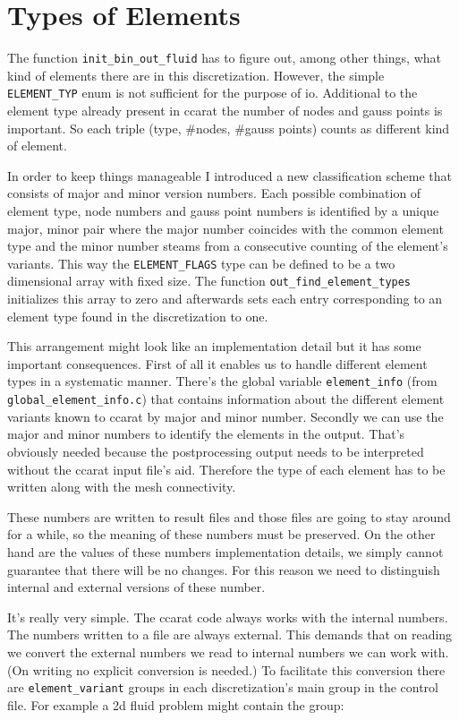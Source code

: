 \section{Types of Elements}

The function \texttt{init{\_}bin{\_}out{\_}fluid} has to figure
out, among other things, what kind of elements there are in this discretization.
However, the simple \texttt{ELEMENT{\_}TYP} enum is not sufficient
for the purpose of io. Additional to the element type already present
in ccarat the number of nodes and gauss points is important. So each
triple (type, {\#}nodes, {\#}gauss points) counts as different
kind of element.

In order to keep things manageable I introduced a new classification
scheme that consists of major and minor version numbers. Each possible
combination of element type, node numbers and gauss point numbers
is identified by a unique major, minor pair where the major number
coincides with the common element type and the minor number steams
from a consecutive counting of the element's variants. This way the
\texttt{ELEMENT{\_}FLAGS} type can be defined to be a two dimensional
array with fixed size. The function \texttt{out{\_}find{\_}element{\_}types}
initializes this array to zero and afterwards sets each entry corresponding
to an element type found in the discretization to one.

This arrangement might look like an implementation detail but it has
some important consequences. First of all it enables us to handle
different element types in a systematic manner. There's the global
variable \texttt{element{\_}info} (from \texttt{global{\_}element{\_}info.c})
that contains information about the different element variants known
to ccarat by major and minor number. Secondly we can use the major
and minor numbers to identify the elements in the output. That's obviously
needed because the postprocessing output needs to be interpreted without
the ccarat input file's aid. Therefore the type of each element has
to be written along with the mesh connectivity.

These numbers are written to result files and those files are going
to stay around for a while, so the meaning of these numbers must be
preserved. On the other hand are the values of these numbers implementation
details, we simply cannot guarantee that there will be no changes.
For this reason we need to distinguish internal and external versions
of these number.

It's really very simple. The ccarat code always works with the internal
numbers. The numbers written to a file are always external. This demands
that on reading we convert the external numbers we read to internal
numbers we can work with. (On writing no explicit conversion is needed.)
To facilitate this conversion there are \texttt{element{\_}variant}
groups in each discretization's main group in the control file. For
example a 2d fluid problem might contain the group: 

